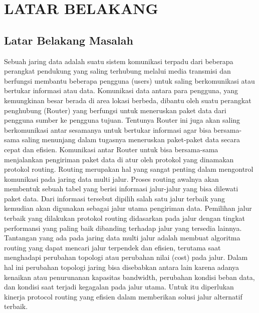 \documentclass{jtetiproposalskripsi}
\begin{document}
\chapter{LATAR BELAKANG}

\section{Latar Belakang Masalah}
Sebuah  jaring  data  adalah  suatu  sistem  komunikasi terpadu  dari  beberapa  perangkat  pendukung  yang saling  terhubung  melalui  media  transmisi  dan berfungsi  membantu  beberapa  pengguna  (users) untuk  saling  berkomunikasi atau  bertukar  informasi atau  data.  Komunikasi  data  antara  para  pengguna, yang  kemungkinan  besar  berada  di  area  lokasi berbeda,  dibantu  oleh  suatu  perangkat  penghubung (Router)  yang  berfungsi  untuk  meneruskan  paket data  dari  pengguna  sumber  ke  pengguna  tujuan. Tentunya Router ini juga akan saling berkomunikasi antar  sesamanya untuk  bertukar  informasi agar bisa bersama-sama  saling  menunjang  dalam  tugasnya meneruskan  paket-paket  data  secara  cepat  dan 
efisien. Komunikasi  antar Router  untuk  bisa  bersama-sama menjalankan  pengiriman  paket  data  di  atur  oleh protokol  yang  dinamakan protokol  routing. Routing merupakan  hal  yang  sangat  penting  dalam mengontrol komunikasi pada  jaring data multi  jalur. Proses  routing  awalnya  akan  membentuk  sebuah tabel  yang  berisi  informasi  jalur-jalur  yang  bisa dilewati  paket  data.  Dari  informasi  tersebut  dipilih salah  satu  jalur  terbaik  yang  kemudian  akan digunakan  sebagai  jalur  utama  pengiriman  data. Pemilihan  jalur  terbaik  yang  dilakukan  protokol routing  didasarkan  pada  jalur  dengan  tingkat performansi  yang  paling  baik  dibanding  terhadap jalur yang tersedia lainnya. Tantangan  yang  ada  pada  jaring  data  multi  jalur adalah  membuat  algoritma  routing  yang  dapat mencari  jalur  terpendek  dan  efisien,  terutama  saat menghadapi  perubahan  topologi  atau  perubahan nilai  (cost)  pada  jalur.  Dalam  hal  ini  perubahan topologi  jaring  bisa  disebabkan  antara  lain  karena adanya  kenaikan  atau  penurunanan  kapasitas bandwidth,  perubahan  kondisi  beban  data,  dan kondisi  saat  terjadi  kegagalan  pada  jalur  utama. Untuk  itu  diperlukan  kinerja  protocol  routing  yang efisien  dalam  memberikan  solusi  jalur  alternatif terbaik.   
\end{document}
